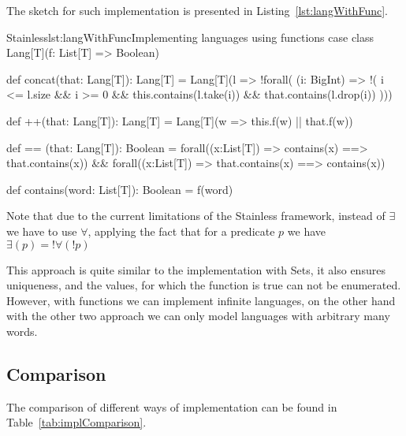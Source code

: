 The sketch for such implementation is presented in Listing~\ref{lst:langWithFunc}.

\begin{Code}{Stainless}{lst:langWithFunc}{Implementing languages using functions}
case class Lang[T](f: List[T] => Boolean) {
	
  def concat(that: Lang[T]): Lang[T] = {
    Lang[T](l => !forall( (i: BigInt) => !(
      i <= l.size &&
      i >= 0 &&
      this.contains(l.take(i)) &&
      that.contains(l.drop(i))
    )))
  }
  
  def ++(that: Lang[T]): Lang[T] = {
    Lang[T](w => this.f(w) || that.f(w))
  }

  def == (that: Lang[T]): Boolean = {
    forall((x:List[T]) => contains(x) ==> that.contains(x)) &&
    forall((x:List[T]) => that.contains(x) ==> contains(x))
  }

  def contains(word: List[T]): Boolean = f(word)
}
\end{Code}



Note that due to the current limitations of the Stainless framework, instead of $\exists$ we have to use $\forall$, applying the fact that for a predicate $p$ we have $\exists(p) = ! \forall(!p)$


This approach is quite similar to the implementation with Sets, it also ensures uniqueness, and the values, for which the function is true can not be enumerated. However, with functions we can implement infinite languages, on the other hand with the other two approach we can only model languages with arbitrary many words.

\subsection{Comparison}
\label{sect:impl.comp}
The comparison of different ways of implementation can be found in Table~\ref{tab:implComparison}.


